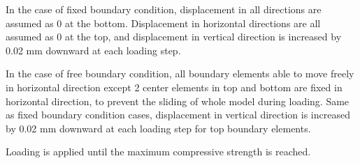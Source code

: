 In the case of fixed boundary condition, displacement in all directions are assumed as 0 at the bottom. Displacement in horizontal directions are all assumed as 0 at the top, and displacement in vertical direction is increased by 0.02 mm downward at each loading step.

In the case of free boundary condition, all boundary elements able to move freely in horizontal direction except 2 center elements in top and bottom are fixed in horizontal direction, to prevent the sliding of whole model during loading. Same as fixed boundary condition cases, displacement in vertical direction is increased by 0.02 mm downward at each loading step for top boundary elements.

Loading is applied until the maximum compressive strength is reached.
